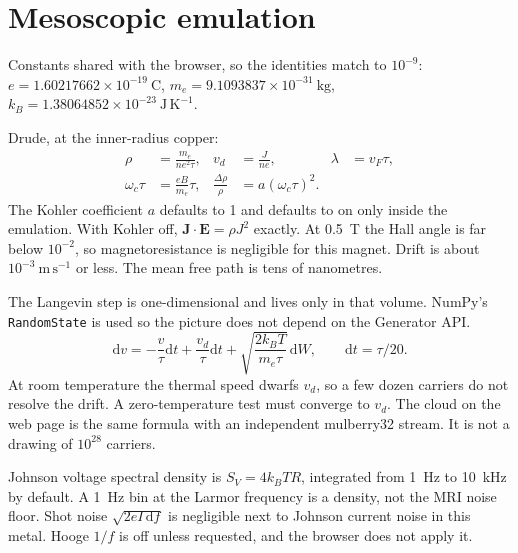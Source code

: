 \documentclass[11pt]{article}
\begin{document}
\section{Mesoscopic emulation}

Constants shared with the browser, so the identities match to $10^{-9}$:
$e=1.60217662\times 10^{-19}~\mathrm{C}$,
$m_e=9.1093837\times 10^{-31}~\mathrm{kg}$,
$k_B=1.38064852\times 10^{-23}~\mathrm{J\,K^{-1}}$.

Drude, at the inner-radius copper:
\begin{align}
\rho &= \frac{m_e}{n e^2 \tau},&
v_d &= \frac{J}{n e},&
\lambda &= v_F \tau,\\
\omega_c\tau &= \frac{eB}{m_e}\tau,&
\frac{\Delta\rho}{\rho} &= a(\omega_c\tau)^2.
\end{align}
The Kohler coefficient $a$ defaults to 1 and defaults to on only inside the emulation.
With Kohler off, $\mathbf{J}\cdot\mathbf{E}=\rho J^2$ exactly.
At 0.5~T the Hall angle is far below $10^{-2}$, so magnetoresistance is negligible for this magnet.
Drift is about $10^{-3}~\mathrm{m\,s^{-1}}$ or less.
The mean free path is tens of nanometres.

The Langevin step is one-dimensional and lives only in that volume.
NumPy's \texttt{RandomState} is used so the picture does not depend on the Generator API.
\begin{equation}
\mathrm{d}v = -\frac{v}{\tau}\mathrm{d}t + \frac{v_d}{\tau}\mathrm{d}t
+ \sqrt{\frac{2k_B T}{m_e\tau}}\,\mathrm{d}W,
\qquad \mathrm{d}t=\tau/20.
\end{equation}
At room temperature the thermal speed dwarfs $v_d$, so a few dozen carriers do not resolve the drift.
A zero-temperature test must converge to $v_d$.
The cloud on the web page is the same formula with an independent mulberry32 stream.
It is not a drawing of $10^{28}$ carriers.

Johnson voltage spectral density is $S_V=4k_B T R$, integrated from 1~Hz to 10~kHz by default.
A 1~Hz bin at the Larmor frequency is a density, not the MRI noise floor.
Shot noise $\sqrt{2e I\,\mathrm{d}f}$ is negligible next to Johnson current noise in this metal.
Hooge $1/f$ is off unless requested, and the browser does not apply it.
\end{document}
